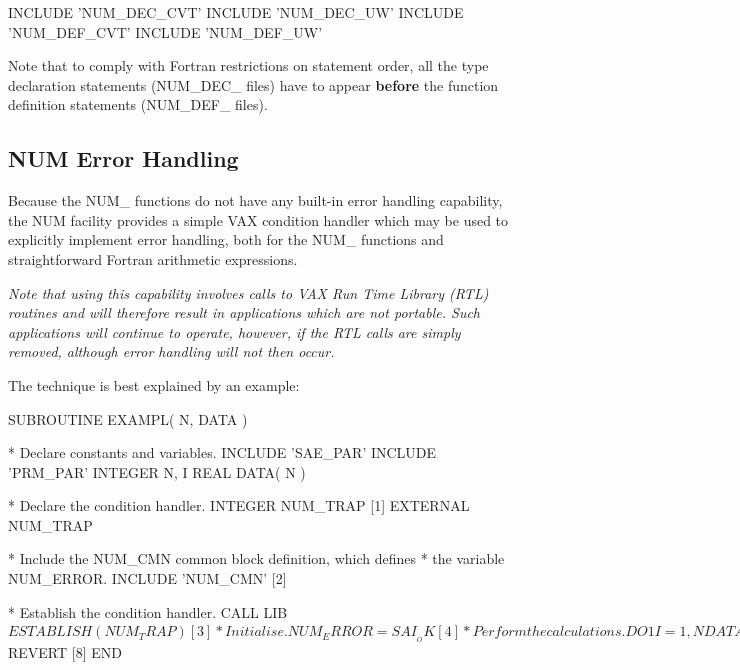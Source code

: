 \documentclass[11pt,nolof]{starlink}
\providecommand{\name}[1]{\mbox{#1}}
\begin{document}
\begin{terminalv}
INCLUDE 'NUM_DEC_CVT'
INCLUDE 'NUM_DEC_UW'
INCLUDE 'NUM_DEF_CVT'
INCLUDE 'NUM_DEF_UW'
\end{terminalv}

Note that to comply with Fortran restrictions on statement order, all the
type declaration statements (\name{NUM\_DEC\_} files) have to appear \textbf{before} the function definition statements (\name{NUM\_DEF\_} files).

\subsection{\name{NUM} Error Handling}
\label{section:num:error}

Because the \name{NUM\_} functions do not have any built-in error handling
capability, the \name{NUM} facility provides a simple \name{VAX} condition
handler which may be used to explicitly implement error handling, both for
the \name{NUM\_} functions and straightforward Fortran arithmetic
expressions.

\emph{Note that using this capability involves calls to \name{VAX} Run
Time Library (\name{RTL}) routines and will therefore result in applications
which are not portable.
Such applications will continue to operate, however, if the \name{RTL} calls
are simply removed, although error handling will not then occur.
}

The technique is best explained by an example:

\begin{small}
\begin{terminalv}
      SUBROUTINE EXAMPL( N, DATA )

*   Declare constants and variables.
      INCLUDE 'SAE_PAR'
      INCLUDE 'PRM_PAR'
      INTEGER N, I
      REAL DATA( N )

*   Declare the condition handler.
      INTEGER NUM_TRAP                            [1]
      EXTERNAL NUM_TRAP

*   Include the NUM_CMN common block definition, which defines
*   the variable NUM_ERROR.
      INCLUDE 'NUM_CMN'                           [2]

*   Establish the condition handler.
      CALL LIB$ESTABLISH( NUM_TRAP )              [3]

*   Initialise.
      NUM_ERROR = SAI__OK                         [4]

*   Perform the calculations.
      DO 1 I = 1, N
         DATA( I ) = 1.0 / ( DATA( I ) ** 2 )     [5]

*   Check if an error occurred.
         IF( NUM_ERROR .NE. SAI__OK ) THEN        [6]

*   If so, reset the NUM_ERROR flag and define the result.
            NUM_ERROR = SAI__OK                   [7]
            DATA( I ) = VAL__BADR
         ENDIF
    1 CONTINUE

*   Remove the condition handler and exit the routine.
      CALL LIB$REVERT                             [8]
      END
\end{terminalv}
\end{small}
\end{document}

